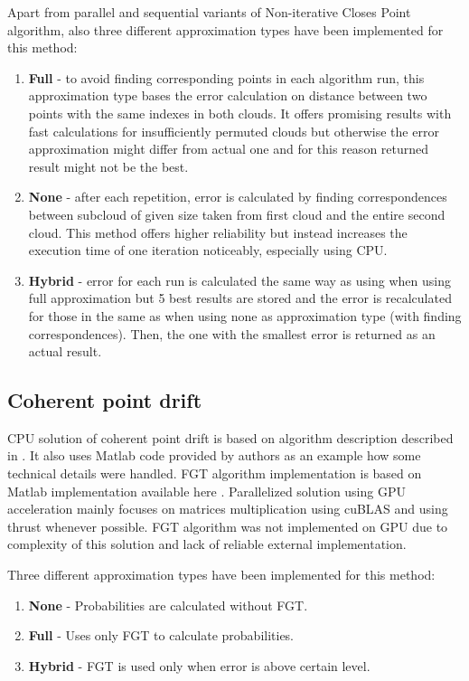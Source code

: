 \documentclass[titlepage]{article}
\begin{document}
Apart from parallel and sequential variants of Non-iterative Closes Point algorithm, also three different approximation types have been implemented for this method:
\begin{enumerate}
\item \textbf{Full} - to avoid finding corresponding points in each algorithm run, this approximation type bases the error calculation on distance between two points with the same indexes in both clouds. It offers promising results with fast calculations for insufficiently permuted clouds but otherwise the error approximation might differ from actual one and for this reason returned result might not be the best.
\item \textbf{None} - after each repetition, error is calculated by finding correspondences between subcloud of given size taken from first cloud and the entire second cloud. This method offers higher reliability but instead increases the execution time of one iteration noticeably, especially using CPU.
\item \textbf{Hybrid} - error for each run is calculated the same way as using when using full approximation but 5 best results are stored and the error is recalculated for those in the same as when using none as approximation type (with finding correspondences). Then, the one with the smallest error is returned as an actual result.
\end{enumerate}

\subsection{Coherent point drift}

CPU solution of coherent point drift is based on algorithm description described in \cite{cpd}. It also uses Matlab code provided by authors as an example how some technical details were handled. FGT algorithm implementation is based on Matlab implementation available here \cite{fgtmatlab}.
Parallelized solution using GPU acceleration mainly focuses on matrices multiplication using cuBLAS and using thrust whenever possible. FGT algorithm was not implemented on GPU due to complexity of this solution and lack of reliable external implementation.

Three different approximation types have been implemented for this method:
\begin{enumerate}
\item \textbf{None} - Probabilities are calculated without FGT.
\item \textbf{Full} - Uses only FGT to calculate probabilities.
\item \textbf{Hybrid} - FGT is used only when error is above certain level.
\end{enumerate}
\end{document}
